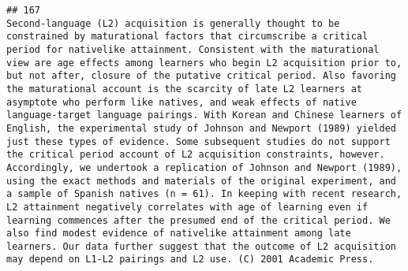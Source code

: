 \documentclass[
  english,
  man]{apa6}
\begin{document}
\begin{verbatim}
## 167                                                                                                                                                                                                                                                                                                                                                                                                                                                                                                                                                                                                                                                                                                                                                                                                                                                                                                                                                                                                                                                                                                                                                                                                                                                                                                                                        Second-language (L2) acquisition is generally thought to be constrained by maturational factors that circumscribe a critical period for nativelike attainment. Consistent with the maturational view are age effects among learners who begin L2 acquisition prior to, but not after, closure of the putative critical period. Also favoring the maturational account is the scarcity of late L2 learners at asymptote who perform like natives, and weak effects of native language-target language pairings. With Korean and Chinese learners of English, the experimental study of Johnson and Newport (1989) yielded just these types of evidence. Some subsequent studies do not support the critical period account of L2 acquisition constraints, however. Accordingly, we undertook a replication of Johnson and Newport (1989), using the exact methods and materials of the original experiment, and a sample of Spanish natives (n = 61). In keeping with recent research, L2 attainment negatively correlates with age of learning even if learning commences after the presumed end of the critical period. We also find modest evidence of nativelike attainment among late learners. Our data further suggest that the outcome of L2 acquisition may depend on L1-L2 pairings and L2 use. (C) 2001 Academic Press.

\end{verbatim}
\end{document}
